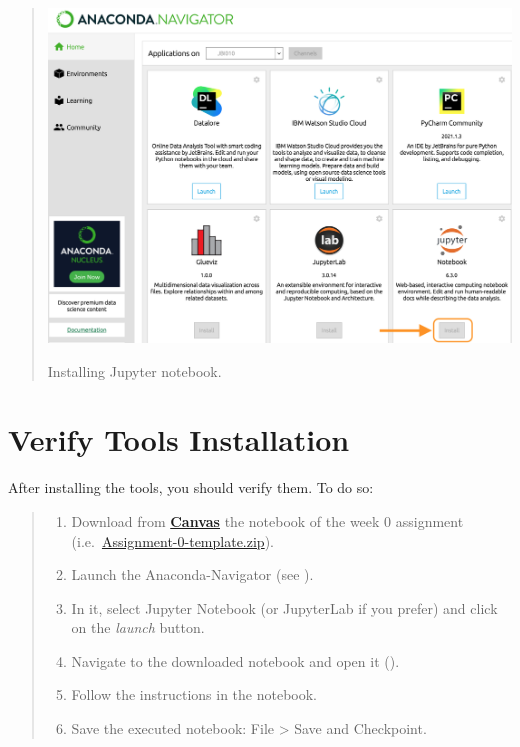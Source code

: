 \documentclass{latex-template/tufte-handout}
\begin{document}
\begin{quote}
\begin{enumerate}
			\begin{marginfigure}%
			  \includegraphics[width=1.2\linewidth]{assets/05-install-jupyter}
			  \caption{Installing Jupyter notebook.}
			  \label{fig:img5}
			\end{marginfigure}
	\end{enumerate}
\end{quote}



\section{Verify Tools Installation}\label{verify-tools-installation}

After installing the tools, you should verify them. To do so:

\begin{quote}
\begin{enumerate}
\def\labelenumi{\arabic{enumi}.}
\item Download from \textbf{\href{https://canvas.tue.nl}{Canvas}} the notebook of the week 0 assignment (i.e.~\href{https://canvas.tue.nl/courses/19301/assignments/69081}{Assignment-0-template.zip}).
\item Launch the Anaconda-Navigator (see ).
\item In it, select Jupyter Notebook (or JupyterLab if you prefer) and click
  on the \emph{launch} button.
\item Navigate to the downloaded notebook and open it ().
\item Follow the instructions in the notebook.
\item Save the executed notebook: File \textgreater{} Save and Checkpoint.
\end{enumerate}

\end{quote}
\end{document}
